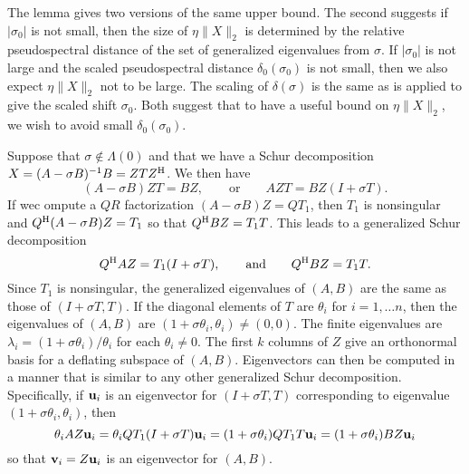 \documentclass[12pt]{article}
\def\eqand{\qquad\mbox{and}\qquad}
\def\vec#1{{\bf #1}}
\def\H{{\rm H}}
\begin{document}
The lemma gives two versions of the same upper bound.  The second
suggests if $|\sigma_0|$ is not small, then the size of $\eta \|X\|_2$
is determined by the relative pseudospectral distance of the set of
generalized eigenvalues from $\sigma$.  If $|\sigma_0|$ is not large
and the scaled pseudospectral distance $\delta_0(\sigma_0)$
is not small, then we also expect $\eta \|X\|_2$ not to be large.  The
scaling of $\delta(\sigma)$ is the same as is applied to give the
scaled shift $\sigma_0$.  Both suggest that to have a useful bound on
$\eta \|X\|_2$, we wish to avoid small $\delta_0(\sigma_0)$.

Suppose that $\sigma \notin \Lambda(0)$ and that we have a Schur
decomposition $X = (A-\sigma B)^{-1} B = ZTZ^\H$.  We then have
\begin{equation*}
  (A -\sigma B) Z T = B Z,\qquad\mbox{or}\qquad
  A Z T = B Z (I +\sigma T).
\end{equation*}
If wec ompute a $QR$ factorization $(A -\sigma B)Z = QT_1$, then $T_1$
is nonsingular and $Q^\H (A-\sigma B) Z = T_1$ so that
$Q^\H BZ = T_1 T$.  This leads to a generalized Schur decomposition
\begin{equation*}
  Q^\H A Z = T_1(I+\sigma T),\eqand Q^\H BZ = T_1 T.
\end{equation*}
Since $T_1$ is nonsingular, the generalized eigenvalues of $(A,B)$ are
the same as those of $(I+\sigma T, T)$.  If the diagonal elements of
$T$ are $\theta_i$ for $i=1,\ldots n$, then the eigenvalues of $(A,B)$
are $(1+\sigma\theta_i, \theta_i)\neq (0,0)$.  The finite eigenvalues
are $\lambda_i = (1+\sigma \theta_i)/\theta_i$ for each
$\theta_i\neq 0$.  The first $k$ columns of $Z$ give an orthonormal
basis for a deflating subspace of $(A,B)$.  Eigenvectors can then be
computed in a manner that is similar to any other generalized Schur
decomposition.  Specifically, if $\vec{u}_i$ is an eigenvector for
$(I+\sigma T, T)$ corresponding to eigenvalue
$(1+\sigma\theta_i, \theta_i)$, then
\begin{equation*}
  \theta_i A Z \vec{u}_i 
  = \theta_i QT_1(I+\sigma T) \vec{u}_i
  = (1+\sigma \theta_i) Q T_1 T \vec{u}_i
  = (1+\sigma \theta_i) B Z \vec{u}_i
\end{equation*}
so that $\vec{v}_i = Z \vec{u}_i$ is an eigenvector for $(A,B)$.
\end{document}
